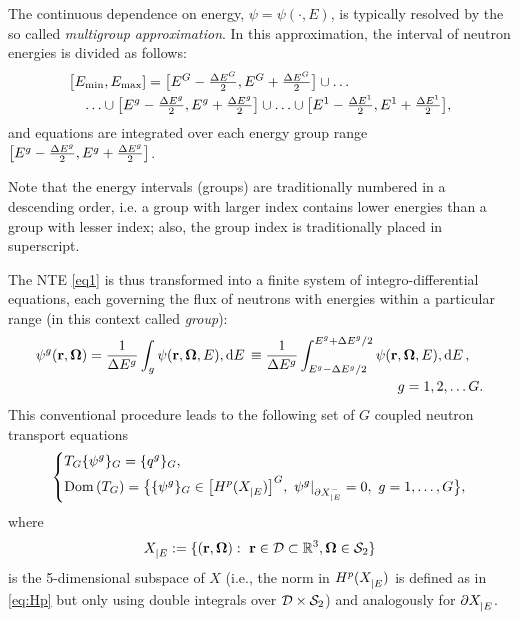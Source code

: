The continuous dependence on energy, $\psi = \psi(\cdot, E)$, is typically resolved by the so called \textit{multigroup
approximation}. In this approximation, the interval of neutron energies is divided as follows:
$$
\begin{multlined}
  \bigl[\Emin,\Emax] = \bigl[E^{G}-\dEh{G},E^{G}+\dEh{G}\bigr]\cup \ldots\\
  \ldots \cup \bigl[E^{g}-\dEh{g}, E^{g}+\dEh{g}\bigr] \cup \ldots \cup
  \bigl[E^1-\dEh{1},E^{1}+\dEh{1}\bigr],
\end{multlined} 
$$
and equations  are integrated over each energy group range 
\linebreak
\mbox{$\bigl[E^{g}-\dEh{g}, E^{g}+\dEh{g}\bigr]$}.
\begin{remark}
Note that the energy intervals (groups) are traditionally numbered in a descending order, i.e. a group with larger index
contains lower energies than a group with lesser index; also, the group index is traditionally placed in superscript. 
\end{remark}
The NTE \eqref{eq1} is thus transformed into a finite system of integro-differential equations, each
governing the flux of neutrons with energies within a particular range (in this context called \textit{group}):
\begin{equation}\label{eq:psi-MG}
\begin{multlined}
  \psi^g(\br, \bomega) = \frac{1}{\Delta E^{g}}\int_{g}\psi(\br, \bomega, E),\d{E} \equiv
  \frac{1}{\Delta E^{g}}\int_{E^g-\Delta E^{g}/2}^{E^g+\Delta E^{g}/2}\psi(\br, \bomega, E),\d{E},\\ g = 1, 2,\ldots
  G.
\end{multlined}
\end{equation} 
This conventional procedure leads to the following set of $G$ coupled neutron transport equations
\begin{equation}\label{eq:mg}
	\left\{
	  \begin{aligned}
      &T_G\{\psi^g\}_G = \{q^g\}_G,\\
      &\Dom{T_G} = \bigl\{\{\psi^g\}_G\in \bigl[\Hp(\XE)\bigr]^G,\ \psi^g\vert_{\pXE[-]} = 0,\ g = 1,\ldots,G\bigr\},
    \end{aligned}
  \right.\\[.2em]
\end{equation}
where
$$
	\XE := \{(\br,\bomega):\ \br\in \VV\subset\R[3], \bomega\in \Sphere\}
$$
is the 5-dimensional subspace of $X$ (i.e., the norm in $\Hp(\XE)$ is defined as
in \eqref{eq:Hp} but only using double integrals over $\VV\times\Sphere$) and analogously for $\pXE$.
